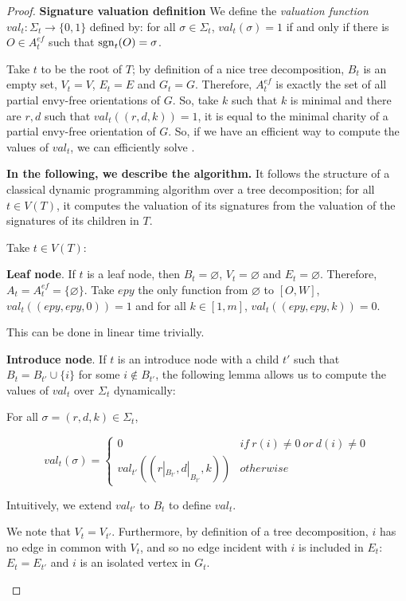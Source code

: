 \begin{proof}
    \textbf{Signature valuation definition} We define the \emph{valuation function} $val_t \colon \Sigma_t \to \{0,1\}$ defined by: for all $\sigma\in \Sigma_t$, $val_t(\sigma)=1$ if and only if there is $O\in A_t^{ef}$ such that $\operatorname{sgn}_t(O)=\sigma$.
    \medskip

    Take $t$ to be the root of $T$; by definition of a nice tree decomposition, $B_t$ is an empty set, $V_t=V$, $E_t=E$ and $G_t=G$. Therefore, $A_t^{ef}$ is exactly the set of all partial envy-free orientations of $G$. So, take $k$ such that $k$ is minimal and there are $r,d$ such that $val_t((r,d,k))=1$, it is equal to the minimal charity of a partial envy-free orientation of $G$. So, if we have an efficient way to compute the values of $val_t$, we can efficiently solve \EFmc.


    \textbf{In the following, we describe the algorithm.} It follows the structure of a classical dynamic programming algorithm over a tree decomposition; for all $t\in V(T)$, it computes the valuation of its signatures from the valuation of the signatures of its children in $T$.

    Take $t\in V(T)$:

    \textbf{Leaf node}. If $t$ is a leaf node, then $B_t=\varnothing$, $V_t=\varnothing$ and $E_t=\varnothing$. Therefore, $A_t=A_t^{ef}=\{\varnothing\}$. Take $epy$ the only function from $\varnothing$ to $[O,W]$, $val_t((epy,epy,0))=1$ and for all $k\in [1,m]$, $val_t((epy,epy,k))=0$.

    This can be done in linear time trivially.
    \medskip

    \textbf{Introduce node}. If $t$ is an introduce node with a child $t'$ such that $B_t=B_{t'}\cup \{i\}$ for some $i\notin B_{t'}$, the following lemma allows us to compute the values of $val_t$ over $\Sigma_t$ dynamically:
    \begin{lemma}
    For all $\sigma=(r,d,k)\in \Sigma_t$,

    \[val_t(\sigma)=
    \begin{cases}
        0 & if\ r(i)\neq 0\ or\ d(i)\neq 0 \\
        val_{t'}((r|_{B_{t'}},d|_{B_{t'}},k)) & otherwise
    \end{cases}\]

    \end{lemma}

    Intuitively, we extend $val_{t'}$ to $B_t$ to define $val_t$.

    \begin{nestedproof}
    We note that $V_t=V_{t'}$. Furthermore, by definition of a tree decomposition, $i$ has no edge in common with $V_t$, and so no edge incident with $i$ is included in $E_t$: $E_t=E_{t'}$ and $i$ is an isolated vertex in $G_t$.


\end{nestedproof}
\end{proof}
